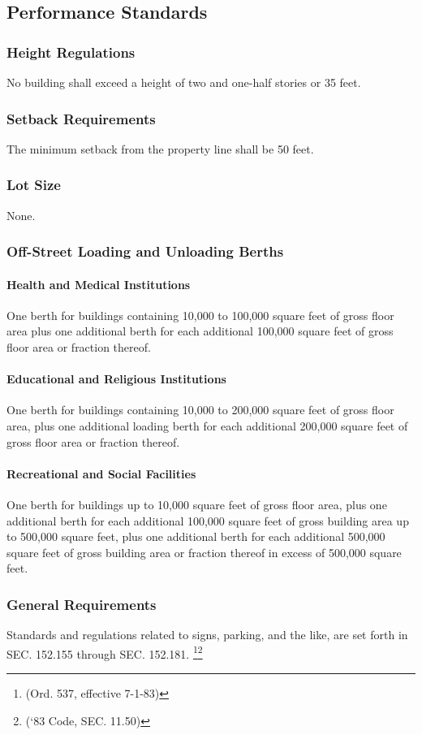 \subsection{Performance Standards}
\subsubsection{Height Regulations}
No building shall exceed a height of two and one-half stories or 35 feet.
\subsubsection{Setback Requirements}
The minimum setback from the property line shall be 50 feet.
\subsubsection{Lot Size}
None.
\subsubsection{Off-Street Loading and Unloading Berths}
\paragraph{Health and Medical Institutions}
One berth for buildings containing 10,000 to 100,000 square feet of gross floor area plus one additional berth for each additional 100,000 square feet of gross floor area or fraction thereof.
\paragraph{Educational and Religious Institutions}
One berth for buildings containing 10,000 to 200,000 square feet of gross floor area, plus one additional loading berth for each additional 200,000 square feet of gross floor area or fraction thereof.
\paragraph{Recreational and Social Facilities}
One berth for buildings up to 10,000 square feet of gross floor area, plus one additional berth for each additional 100,000 square feet of gross building area up to 500,000 square feet, plus one additional berth for each additional 500,000 square feet of gross building area or fraction thereof in excess of 500,000 square feet.
\subsubsection{General Requirements}
Standards and regulations related to signs, parking, and the like, are set forth in SEC. 152.155 through SEC. 152.181. \footnote{(Ord. 537, effective 7-1-83)}\footnote{(‘83 Code, SEC. 11.50)}

